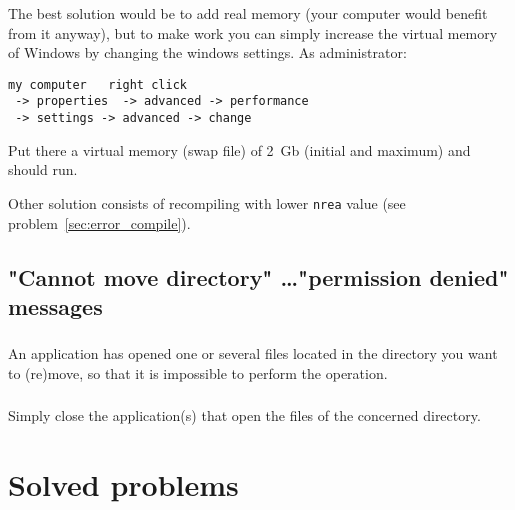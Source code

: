 \subsubsection{\answer}

The best solution would be to 
add real memory (your computer would benefit from it anyway), but to 
make \diva work you can simply increase the virtual memory of Windows by 
changing the windows settings. As administrator:\\

\begin{verbatim}
my computer   right click
 -> properties  -> advanced -> performance
 -> settings -> advanced -> change
\end{verbatim}

Put there a virtual memory (swap file) of 2~Gb (initial and maximum) and 
\diva should run. 

Other solution consists of recompiling with lower \texttt{nrea} value (see problem~\ref{sec:error_compile}).


\subsection{"Cannot move directory" \ldots "permission denied" messages}



\subsubsection{\question}

An application has opened one or several files located in the directory you want to (re)move, so that it is impossible to perform the operation.

\subsubsection{\answer}

Simply close the application(s) that open the files of the concerned directory.


\section{Solved problems}



